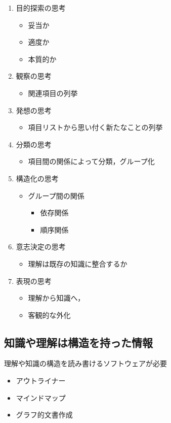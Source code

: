\documentclass[dvipdfmx,11pat]{jarticle}
\begin{document}
\begin{enumerate}
\item 目的探索の思考
\begin{itemize}
\item 妥当か
\item 適度か
\item 本質的か
\end{itemize}
\item 観察の思考
\begin{itemize}
\item 関連項目の列挙
\end{itemize}
\item 発想の思考
\begin{itemize}
\item 項目リストから思い付く新たなことの列挙
\end{itemize}
\item 分類の思考
\begin{itemize}
\item 項目間の関係によって分類，グループ化
\end{itemize}
\item 構造化の思考
\begin{itemize}
\item グループ間の関係
\begin{itemize}
\item 依存関係
\item 順序関係
\end{itemize}
\end{itemize}
\item 意志決定の思考
\begin{itemize}
\item 理解は既存の知識に整合するか
\end{itemize}
\item 表現の思考
\begin{itemize}
\item 理解から知識へ，
\item 客観的な外化
\end{itemize}
\end{enumerate}
\subsection{知識や理解は構造を持った情報}
\label{sec:orgdbe5e5a}

理解や知識の構造を読み書けるソフトウェアが必要
\begin{itemize}
\item アウトライナー
\item マインドマップ
\item グラフ的文書作成
\end{itemize}
\end{document}

